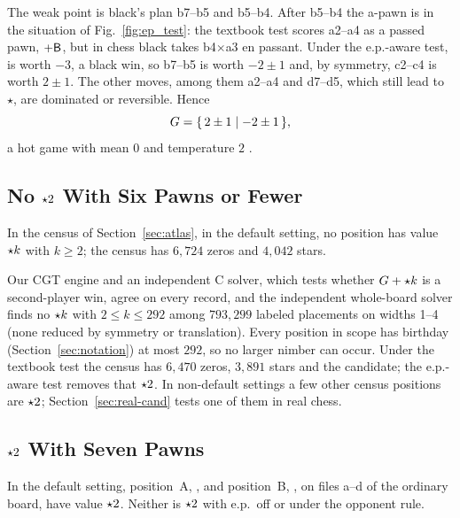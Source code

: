 The weak point is black's plan b7--b5 and b5--b4. After b5--b4 the a-pawn is in the situation of
Fig.~\ref{fig:ep_test}: the textbook test scores a2--a4 as a passed pawn, $+\mathsf{B}$, but in chess black takes
b4$\times$a3 en passant. Under the e.p.-aware test,  is worth $-3$, a black win, so
b7--b5 is worth $-2\pm1$ and, by symmetry, c2--c4 is worth $2\pm1$. The other moves, among them a2--a4 and
d7--d5, which still lead to $\star$, are dominated or reversible. Hence
\[
G=\{\,2\pm1 \mid -2\pm1\,\},
\]
a hot game with mean $0$ and temperature $2$ .

\subsection{No \texorpdfstring{$\mathord{\star2}$}{*2} With Six Pawns or Fewer}

\begin{theorem}\label{thm:census}
In the census of Section~\ref{sec:atlas}, in the default setting, no position has value $\mathord{\star k}$ with
$k\ge2$; the census has $6{,}724$ zeros and $4{,}042$ stars.
\end{theorem}

Our CGT engine and an independent C solver, which tests whether $G+\mathord{\star k}$ is a second-player win, agree on
every record, and the independent whole-board solver finds no $\mathord{\star k}$ with $2\le k\le 292$ among
$793{,}299$ labeled placements on widths 1--4 (none reduced by symmetry or translation). Every position in scope has birthday (Section~\ref{sec:notation}) at most $292$, so no
larger nimber can occur. Under the textbook test the census has $6{,}470$ zeros, $3{,}891$ stars and the
candidate; the e.p.-aware test removes that $\mathord{\star2}$. In non-default settings a few other census
positions are $\mathord{\star2}$; Section~\ref{sec:real-cand} tests one of them in real chess.

\subsection{\texorpdfstring{$\mathord{\star2}$}{*2} With Seven Pawns}

\begin{theorem}\label{thm:star2seven}
In the default setting, position~A, , and position~B,
, on files a--d of the ordinary board, have value $\mathord{\star2}$. Neither is $\mathord{\star2}$ with e.p.\ off or under the opponent rule.
\end{theorem}

